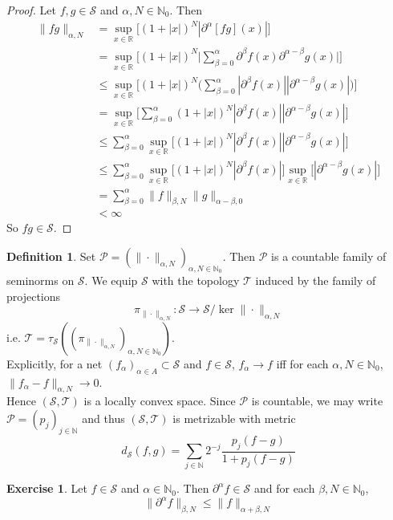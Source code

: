 \documentclass[12pt]{amsart}
\theoremstyle{definition}
\newtheorem{defn}[definition]{Definition}
\newtheorem{ex}[definition]{Exercise}
\newcommand{\p}{\partial}
\newcommand{\al}{\alpha}
\newcommand{\bet}{\beta}
\newcommand{\N}{\mathbb{N}}
\newcommand{\R}{\mathbb{R}}
\newcommand{\MS}{\mathcal{S}}
\newcommand{\MP}{\mathcal{P}}
\newcommand{\MT}{\mathcal{T}}
\begin{document}
	\begin{proof}
		Let $f,g \in \MS$ and $\al, N \in \N_0$. Then 
		\begin{align*}
			\|fg\|_{\al, N}
			& = \sup_{x \in \R} \bigg[ (1 + |x|)^N|\p^{\al}[fg](x)| \bigg] \\
			& = \sup_{x \in \R} \bigg[ (1 + |x|)^N \bigg | \sum\limits_{\bet=0}^\al \p^{\bet}f(x)\p^{\al - \bet}g(x) \bigg|  \bigg] \\
			& \leq \sup_{x \in \R} \bigg[ (1 + |x|)^N \bigg( \sum\limits_{\bet=0}^\al |\p^{\bet}f(x)||\p^{\al - \bet}g(x)| \bigg) \bigg] \\
			& = \sup_{x \in \R} \bigg[   \sum\limits_{\bet=0}^\al (1 + |x|)^N|\p^{\bet}f(x)| |\p^{\al - \bet}g (x)| \bigg] \\
			& \leq \sum\limits_{\bet=0}^\al \sup_{x \in \R} \bigg[ (1 + |x|)^N|\p^{\bet}f(x)| |\p^{\al - \bet}g (x)| \bigg] \\
			& \leq \sum\limits_{\bet=0}^\al \sup_{x \in \R} \bigg[ (1 + |x|)^N|\p^{\bet}f(x)| \bigg]  \sup_{x \in \R} \bigg[|\p^{\al - \bet}g (x) | \bigg] \\
			& = \sum\limits_{\bet=0}^\al  \|f\|_{\bet, N} \|g\|_{\al - \bet, 0} \\
			& < \infty
		\end{align*} 
		So $fg \in \MS$.
	\end{proof}

	\begin{defn}
		Set $\MP = (\|\cdot\|_{\al, N})_{\al, N \in \N_0}$. Then $\MP$ is a countable family of seminorms on $\MS$. We equip $\MS$ with the topology $\MT$ induced by the family of projections $$\pi_{\| \cdot \|_{\al,N}}: \MS \rightarrow \MS / \ker \|\cdot\|_{\al,N} $$ 
		i.e. $\MT = \tau_{\MS}((\pi_{\|\cdot\|_{\al,N}})_{\al, N \in \N_0})$.  \\
		Explicitly, for a net $(f_{\al})_{\al \in A} \subset \MS$ and $f \in \MS$, $f_{\al} \rightarrow f$ iff for each $\al, N \in \N_0$, $\|f_{\al} - f\|_{\al, N} \rightarrow 0$. \\
		Hence $(\MS, \MT)$ is a locally convex space. Since $\MP$ is countable, we may write $\MP = (p_j)_{j \in \N}$ and thus $(\MS, \MT)$ is metrizable with metric
		$$d_{\MS}(f,g) = \sum_{j \in \N} 2^{-j} \frac{p_j(f-g)}{1 + p_j(f-g)}$$
	\end{defn}

	\begin{ex}
		Let $f \in \MS$ and $\al \in \N_0$. Then $\p^{\al}f \in \MS$ and for each $\bet, N \in \N_0$, 
		$$\|\p^{\al} f \|_{\bet, N} \leq \|f \|_{\al + \bet, N}$$ 
	\end{ex}
	
\end{document}
